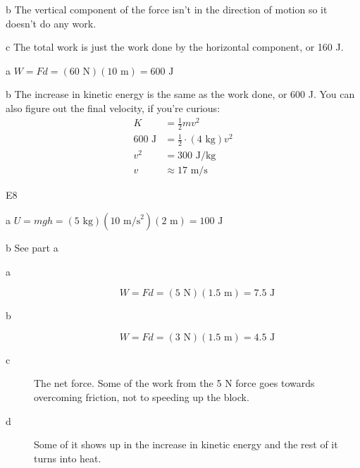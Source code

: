 \documentclass{exam}
\begin{document}
\begin{description}
\begin{description*}
\item[b] The vertical component of the force isn't in the direction of motion so it doesn't do any work.

\item[c] The total work is just the work done by the horizontal component, or 160 J.

\end{description*}

\item[E6]
\begin{description*}

\item[a] $W = Fd = (60 \text{ N})(10 \text{ m}) = 600 \text{ J}$    

\item[b] The increase in kinetic energy is the same as the work done, or 600 J.  You can also figure out the final
  velocity, if you're curious:
\begin{align*}
  K &= \frac{1}{2} mv^2 \\
  600 \text{ J} &= \frac{1}{2} \cdot (4 \text{ kg}) v^2 \\
  v^2 &= 300 \text{ J/kg} \\
  v &\approx 17 \text{ m/s}
\end{align*}

\item[E8]
\begin{description*}
  \item[a] $U = mgh = (5 \text{ kg})(10 \text{ m/s}^2)(2 \text{ m}) = 100 \text{ J}$

  \item[b] See part a
\end{description*}

\end{description*}

\item[SP1]

\begin{description}
\item[a]
\[
  W = Fd = (5 \text{ N})(1.5 \text{ m}) = 7.5 \text{ J}
\]

\item[b]
\[
  W = Fd = (3 \text{ N})(1.5 \text{ m}) = 4.5 \text{ J}
\]

\item[c]
The net force.  Some of the work from the 5 N force goes towards overcoming friction, not to speeding up the block.

\item[d]
Some of it shows up in the increase in kinetic energy and the rest of it turns into heat.


\end{description}
\end{description}
\end{document}
